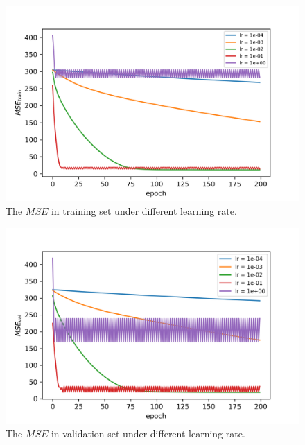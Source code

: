 \documentclass[journal, a4paper]{IEEEtran}
\begin{document}
\begin{figure}[!hbt]
	\begin{center}
		\includegraphics[width=\columnwidth]{lr_train}
		\caption{The $MSE$ in training set under different learning rate.}
		\label{fig:lr_train}
	\end{center}
\end{figure} 

\begin{figure}[!hbt]
	\begin{center}
		\includegraphics[width=\columnwidth]{lr_val}
		\caption{The $MSE$ in validation set under different learning rate.}
		\label{fig:lr_val}
	\end{center}
\end{figure} 
\end{document}
